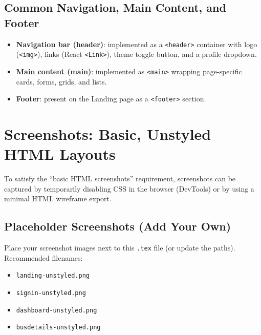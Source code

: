 \documentclass[12pt,a4paper]{report}
\begin{document}
\subsection{Common Navigation, Main Content, and Footer}
\begin{itemize}[leftmargin=1.2cm]
  \item \textbf{Navigation bar (header)}: implemented as a \texttt{<header>} container with logo (\texttt{<img>}), links (React \texttt{<Link>}), theme toggle button, and a profile dropdown.
  \item \textbf{Main content (main)}: implemented as \texttt{<main>} wrapping page-specific cards, forms, grids, and lists.
  \item \textbf{Footer}: present on the Landing page as a \texttt{<footer>} section.
\end{itemize}

\section{Screenshots: Basic, Unstyled HTML Layouts}
To satisfy the ``basic HTML screenshots'' requirement, screenshots can be captured by temporarily disabling CSS in the browser (DevTools) or by using a minimal HTML wireframe export.

\subsection{Placeholder Screenshots (Add Your Own)}
Place your screenshot images next to this \texttt{.tex} file (or update the paths). Recommended filenames:
\begin{itemize}[leftmargin=1.2cm]
  \item \texttt{landing-unstyled.png}
  \item \texttt{signin-unstyled.png}
  \item \texttt{dashboard-unstyled.png}
  \item \texttt{busdetails-unstyled.png}
\end{itemize}
\end{document}
